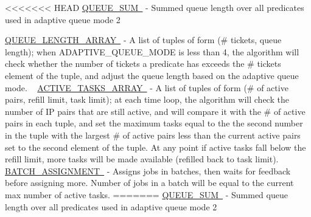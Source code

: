 <<<<<<< HEAD
\mbox{\hyperlink{namespacedynamicfilterapp_1_1toggles_a472153a69096a3f18b32cd5ac247f658}{Q\+U\+E\+U\+E\+\_\+\+S\+UM }} -\/ Summed queue length over all predicates used in adaptive queue mode 2

\mbox{\hyperlink{namespacedynamicfilterapp_1_1toggles_af8d4fe75258dd9f8b4c8cdb1b5b68ad1}{Q\+U\+E\+U\+E\+\_\+\+L\+E\+N\+G\+T\+H\+\_\+\+A\+R\+R\+AY }} -\/ A list of tuples of form (\# tickets, queue length); when A\+D\+A\+P\+T\+I\+V\+E\+\_\+\+Q\+U\+E\+U\+E\+\_\+\+M\+O\+DE is less than 4, the algorithm will check whether the number of tickets a predicate has exceeds the \# tickets element of the tuple, and adjust the queue length based on the adaptive queue mode. ~\newline
 \mbox{\hyperlink{namespacedynamicfilterapp_1_1toggles_a8f7b1e7beea29c74a7defab7d44ef294}{A\+C\+T\+I\+V\+E\+\_\+\+T\+A\+S\+K\+S\+\_\+\+A\+R\+R\+AY }} -\/ A list of tuples of form (\# of active pairs, refill limit, task limit); at each time loop, the algorithm will check the number of IP pairs that are still active, and will compare it with the \# of active pairs in each tuple, and set the maximum tasks equal to the the second number in the tuple with the largest \# of active pairs less than the current active pairs set to the second element of the tuple. At any point if active tasks fall below the refill limit, more tasks will be made available (refilled back to task limit). ~\newline
 \mbox{\hyperlink{namespacedynamicfilterapp_1_1toggles_ab1f6b66c3fc1afbd280b14695b54f33f}{B\+A\+T\+C\+H\+\_\+\+A\+S\+S\+I\+G\+N\+M\+E\+NT }} -\/ Assigns jobs in batches, then waits for feedback before assigning more. Number of jobs in a batch will be equal to the current max number of active tasks.
=======
\mbox{\hyperlink{}{Q\+U\+E\+U\+E\+\_\+\+S\+UM }} -\/ Summed queue length over all predicates used in adaptive queue mode 2

